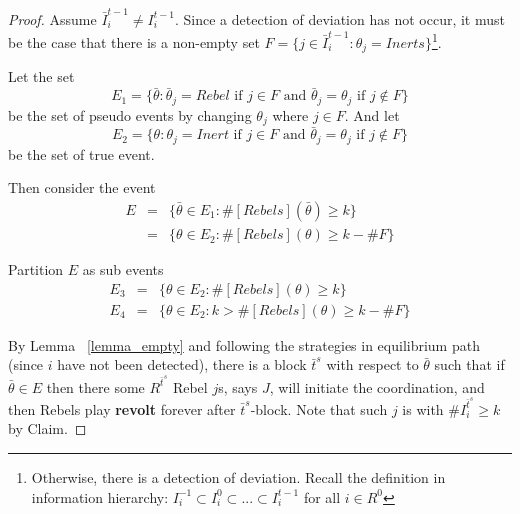 \documentclass[12pt,letter]{article}
\theoremstyle{definition}
\theoremstyle{remark}
\theoremstyle{claim}
\begin{document}
\begin{proof}
Assume $\bar{I}^{t-1}_i\neq I^{t-1}_i$. Since a detection of deviation has not occur, it must be the case that there is a non-empty set $F=\{j\in \bar{I}^{t-1}_i:\theta_j=Inerts\}$\footnote{Otherwise, there is a detection of deviation. Recall the definition in information hierarchy: $I^{-1}_i\subset I^{0}_i\subset...\subset I^{t-1}_i$ for all $i\in R^0$}. 


Let the set 
\[E_1=\{\bar{\theta}: \bar{\theta}_j=Rebel \text{ if } j\in F \text { and }\bar{\theta}_j=\theta_j \text{ if } j\notin F\}\]
be the set of pseudo events by changing $\theta_j$ where $j\in F$. And let
\[E_2=\{\theta: \theta_j=Inert \text{ if }j\in F \text { and }\bar{\theta}_j=\theta_j \text{ if } j\notin F\}\]
be the set of true event.

Then consider the event
\begin{eqnarray*}
E 	&= &\{\bar{\theta}\in E_1: \#[Rebels](\bar{\theta})\geq k\}\\
 	&= &\{\theta\in E_2: \#[Rebels](\theta)\geq k-\#F\}
\end{eqnarray*}

Partition $E$ as sub events
\begin{eqnarray*}
E_3 	&= &\{\theta\in E_2: \#[Rebels](\theta)\geq k\}\\
E_4 	&= &\{\theta\in E_2: k>\#[Rebels](\theta)\geq k-\#F\}
\end{eqnarray*}

By Lemma ~\ref{lemma_empty} and following the strategies in equilibrium path (since $i$ have not been detected), there is a block $\bar{t}^{s}$ with respect to $\bar{\theta}$ such that if $\bar{\theta}\in E$ then there some $R^{\bar{t}^s}$ Rebel $j$s, says $J$, will initiate the coordination, and then Rebels play \textbf{revolt} forever after $\bar{t}^s$-block. Note that such $j$ is with $\# {I}^{\bar{t}^{s}}_i \geq k$ by Claim.


\end{proof}
\end{document}
